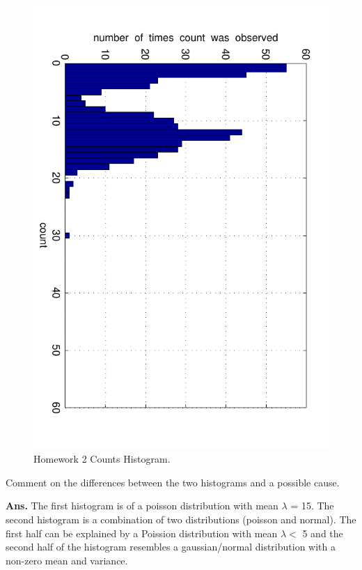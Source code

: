 \documentclass{article}
\begin{document}
{\begin{figure}[H]
\begin{center}
\includegraphics[scale=0.5, angle=90]{HW2Counts.pdf}
\caption{Homework 2 Counts Histogram.}
\end{center}
\end{figure}
Comment on the differences between the two histograms and a possible cause.

\textbf{Ans.} The first histogram is of a poisson distribution with mean $\lambda$ = 15. The second histogram is a combination of two distributions (poisson and normal). The first half can be explained by a Poission distribution with mean $\lambda <$ 5 and the second half of the histogram resembles a gaussian/normal distribution with a non-zero mean and variance.

}
\end{document}
